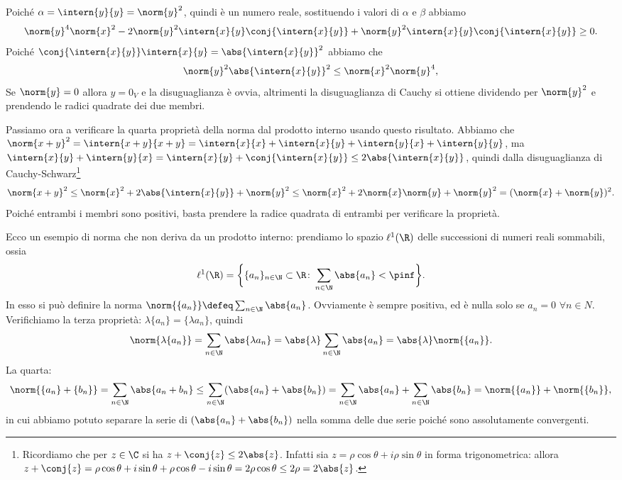 Poiché $\alpha=\intern{  y}{  y}=\norm{  y}^2$, quindi è un numero reale, sostituendo i valori di $\alpha$ e $\beta$ abbiamo
\begin{equation*}
	\norm{  y}^4\norm{  x}^2-2\norm{  y}^2\intern{  x}{  y}\conj{\intern{  x}{  y}}+\norm{  y}^2\intern{  x}{  y}\conj{\intern{  x}{  y}}\geq 0.
\end{equation*}
Poiché $\conj{\intern{  x}{  y}}\intern{  x}{  y}=\abs{\intern{  x}{  y}}^2$ abbiamo che
\begin{equation*}
	\norm{  y}^2\abs{\intern{  x}{  y}}^2\leq\norm{  x}^2\norm{  y}^4,
\end{equation*}
Se $\norm{  y}=0$ allora $  y=0_V$ e la disuguaglianza è ovvia, altrimenti la disuguaglianza di Cauchy si ottiene dividendo per $\norm{  y}^2$ e prendendo le radici quadrate dei due membri.

Passiamo ora a verificare la quarta proprietà della norma dal prodotto interno usando questo risultato.
Abbiamo che $\norm{  x+  y}^2=\intern{  x+  y}{  x+  y}=\intern{  x}{  x}+\intern{  x}{  y}+\intern{  y}{  x}+\intern{  y}{  y}$, ma $\intern{  x}{  y}+\intern{  y}{  x}=\intern{  x}{  y}+\conj{\intern{  x}{  y}}\leq 2\abs{\intern{  x}{  y}}$, quindi dalla disuguaglianza di Cauchy-Schwarz\footnote{Ricordiamo che per $z\in\C$ si ha $z+\conj{z}\leq2\abs{z}$. Infatti sia $z=\rho\cos\theta+i\rho\sin\theta$ in forma trigonometrica: allora $z+\conj{z}=\rho\cos\theta+i\sin\theta+\rho\cos\theta-i\sin\theta=2\rho\cos\theta\leq 2\rho=2\abs{z}$. }
\begin{equation*}
	\norm{  x+  y}^2\leq \norm{  x}^2+2\abs{\intern{  x}{  y}}+\norm{  y}^2
	\leq\norm{  x}^2+2\norm{  x}\norm{  y}+\norm{  y}^2=(\norm{  x}+\norm{  y})^2.
\end{equation*}
Poiché entrambi i membri sono positivi, basta prendere la radice quadrata di entrambi per verificare la proprietà.

Ecco un esempio di norma che non deriva da un prodotto interno: prendiamo lo spazio $\ell^1(\R)$ delle successioni di numeri reali sommabili, ossia
\begin{equation*}
	\ell^1(\R)=\bigg\{\{a_n\}_{n\in\N}\subset\R\colon\sum_{n\in\N}\abs{a_n}<\pinf\bigg\}.
\end{equation*}
In esso si può definire la norma $\norm{\{a_n\}}\defeq\sum_{n\in\N}\abs{a_n}$.
Ovviamente è sempre positiva, ed è nulla solo se $a_n=0$ $\forall n\in N$.
Verifichiamo la terza proprietà: $\lambda\{a_n\}=\{\lambda a_n\}$, quindi
\begin{equation*}
	\norm{\lambda\{a_n\}}=\sum_{n\in\N}\abs{\lambda a_n}=\abs{\lambda}\sum_{n\in\N}\abs{a_n}=\abs{\lambda}\norm{\{a_n\}}.
\end{equation*}
La quarta:
\begin{equation*}
	\norm{\{a_n\}+\{b_n\}}=\sum_{n\in\N}\abs{a_n+b_n}\leq\sum_{n\in\N}(\abs{a_n}+\abs{b_n})
	=\sum_{n\in\N}\abs{a_n}+\sum_{n\in\N}\abs{b_n}=\norm{\{a_n\}}+\norm{\{b_n\}},
\end{equation*}
in cui abbiamo potuto separare la serie di $(\abs{a_n}+\abs{b_n})$ nella somma delle due serie poiché sono assolutamente convergenti.

